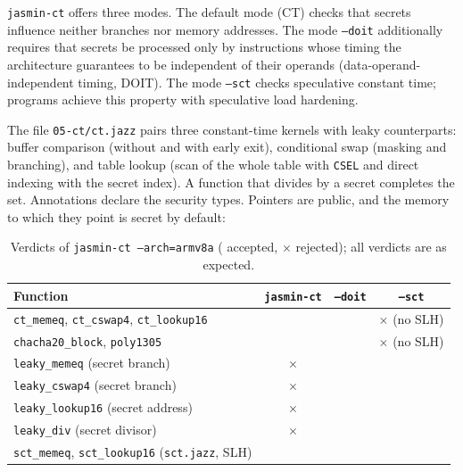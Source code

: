 \documentclass[11pt,a4paper]{article}
\newcommand{\yes}{\checkmark}
\newcommand{\no}{$\times$}
\newcommand{\file}[1]{\texttt{#1}}
\begin{document}
\texttt{jasmin-ct} offers three modes. The default mode (CT) checks that
secrets influence neither branches nor memory addresses. The mode
\texttt{--doit} additionally requires that secrets be processed only by
instructions whose timing the architecture guarantees to be independent of
their operands (data-operand-independent timing, DOIT). The mode \texttt{--sct} checks speculative constant time; programs
achieve this property with speculative load hardening.

The file \file{05-ct/ct.jazz} pairs three constant-time kernels with leaky
counterparts: buffer comparison (without and with early exit), conditional
swap (masking and branching), and table lookup (scan of the whole table with
\texttt{CSEL} and direct indexing with the secret index). A function that
divides by a secret completes the set. Annotations declare the security
types. Pointers are public, and the memory to which they point is secret by
default:



\begin{table}[h]
\centering\small
\begin{tabular}{@{}lccc@{}}
\toprule
\textbf{Function} & \texttt{jasmin-ct} & \texttt{--doit} & \texttt{--sct} \\
\midrule
\texttt{ct\_memeq}, \texttt{ct\_cswap4}, \texttt{ct\_lookup16} & \yes & \yes & \no{} (no SLH) \\
\texttt{chacha20\_block}, \texttt{poly1305} & \yes & \yes & \no{} (no SLH) \\
\texttt{leaky\_memeq} (secret branch) & \no & & \\
\texttt{leaky\_cswap4} (secret branch) & \no & & \\
\texttt{leaky\_lookup16} (secret address) & \no & & \\
\texttt{leaky\_div} (secret divisor) & \no & & \\
\texttt{sct\_memeq}, \texttt{sct\_lookup16} (\file{sct.jazz}, SLH) & & & \yes \\
\bottomrule
\end{tabular}
\caption{Verdicts of \texttt{jasmin-ct --arch=armv8a} (\yes{} accepted, \no{} rejected); all verdicts are as expected.}
\end{table}
\end{document}

